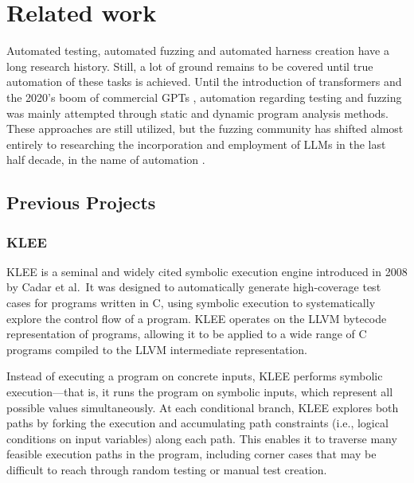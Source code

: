 \documentclass[
  a4paper,
  DIV=11,
  numbers=noendperiod]{scrreprt}
\theoremstyle{definition}
\theoremstyle{remark}
\begin{document}

\chapter{Related work}\label{sec-related}

Automated testing, automated fuzzing and automated harness creation have
a long research history. Still, a lot of ground remains to be covered
until true automation of these tasks is achieved. Until the introduction
of transformers \autocite{vaswani2023} and the 2020's boom of commercial
GPTs \autocite{chatgpt}, automation regarding testing and fuzzing was
mainly attempted through static and dynamic program analysis methods.
These approaches are still utilized, but the fuzzing community has
shifted almost entirely to researching the incorporation and employment
of LLMs in the last half decade, in the name of automation
\autocite{iris,sun2024,prophetfuzz,oss-fuzz-gen,green2022,utopia,fuzzgpt,titanfuzz,fuzzgen,fudge}.

\section{Previous Projects}\label{previous-projects}

\subsection{KLEE}\label{klee}

KLEE \autocite{klee} is a seminal and widely cited symbolic execution
engine introduced in 2008 by Cadar et al.~It was designed to
automatically generate high-coverage test cases for programs written in
C, using symbolic execution to systematically explore the control flow
of a program. KLEE operates on the LLVM \autocite{llvm} bytecode
representation of programs, allowing it to be applied to a wide range of
C programs compiled to the LLVM intermediate representation.

Instead of executing a program on concrete inputs, KLEE performs
symbolic execution---that is, it runs the program on symbolic inputs,
which represent all possible values simultaneously. At each conditional
branch, KLEE explores both paths by forking the execution and
accumulating path constraints (i.e., logical conditions on input
variables) along each path. This enables it to traverse many feasible
execution paths in the program, including corner cases that may be
difficult to reach through random testing or manual test creation.
\end{document}
